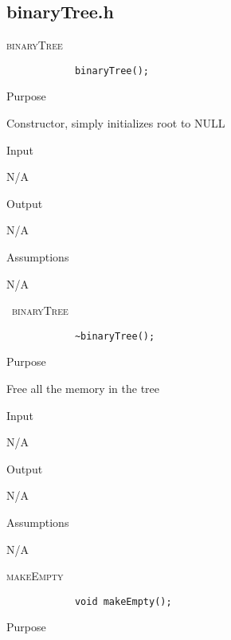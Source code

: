 \documentclass[pdftex, 12pt]{article}
\begin{document}
\subsection{binaryTree.h}
\begin{description}

	\item{\textsc{binaryTree}}
		\begin{lstlisting}
			binaryTree();
		\end{lstlisting}
		\begin{description}

			\item{Purpose}

				Constructor, simply initializes root to NULL

			\item{Input}

				N/A

			\item{Output}

				N/A

			\item{Assumptions}

				N/A

		\end{description}
	\item{\textsc{~binaryTree}}
		\begin{lstlisting}
			~binaryTree();
		\end{lstlisting}
		\begin{description}

			\item{Purpose}

				Free all the memory in the tree

			\item{Input}

				N/A

			\item{Output}

				N/A

			\item{Assumptions}

				N/A

		\end{description}
	\item{\textsc{makeEmpty}}
		\begin{lstlisting}
			void makeEmpty();
		\end{lstlisting}
		\begin{description}

			\item{Purpose}
				

\end{description}
\end{description}
\end{document}

